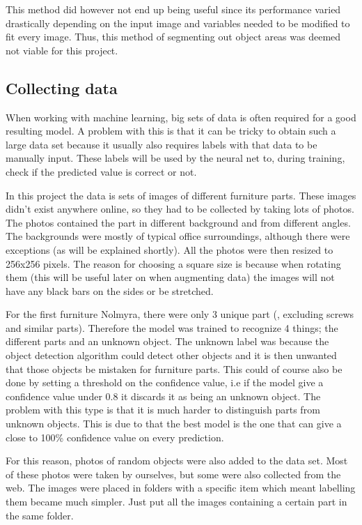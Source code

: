 This method did however not end up being useful since its performance varied drastically depending on the input image and variables needed to be modified to fit every image. Thus, this method of segmenting out object areas was deemed not viable for this project.

\subsection{Collecting data}
When working with machine learning, big sets of data is often required for a good resulting model.
A problem with this is that it can be tricky to obtain such a large data set because it usually also requires
labels with that data to be manually input. These labels will be used by the neural net to, during training, check if
the predicted value is correct or not.

In this project the data is sets of images of different furniture parts. These images didn't exist anywhere online, so they had to be collected by taking lots of photos. The photos contained the part in different background and from different angles. The backgrounds were mostly of typical office surroundings, although there were exceptions (as will be explained shortly). All the photos were then resized to 256x256 pixels. The reason for choosing a square size is because when rotating them (this will be useful later on when augmenting data) the images will not have any black bars on the sides or be stretched.

For the first furniture Nolmyra, there were only 3 unique part (, excluding screws and similar parts). Therefore the model was trained to recognize 4 things; the different parts and an unknown object. The unknown label was because the object detection algorithm could detect other objects and it is then unwanted that those objects be mistaken for furniture parts. This could of course also be done by setting a threshold on the confidence value, i.e if the model give a confidence value under 0.8 it discards it as being an unknown object. The problem with this type is that it is much harder to distinguish parts from unknown objects. This is due to that the best model is the one that can give a close to 100\% confidence value on every prediction.

For this reason, photos of random objects were also added to the data set. Most of these photos were taken by ourselves, but some were also collected from the web. The images were placed in folders with a specific item which meant labelling them became much simpler. Just put all the images containing a certain part in the same folder.

